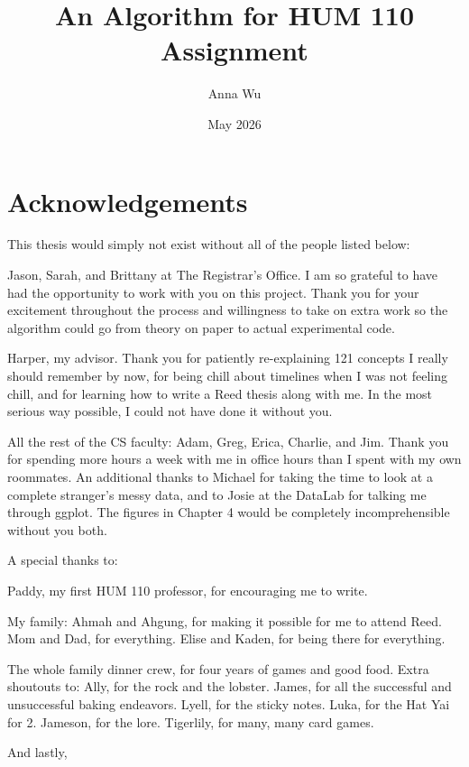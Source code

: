 \documentclass[12pt,twoside]{reedthesis}
\title{An Algorithm for HUM 110 Assignment} \author{Anna Wu} \date{May 2026}
\theoremstyle{definition} \newtheorem{definition}[theorem]{Definition}
\theoremstyle{remark} \newtheorem{remark}[theorem]{Remark}
\begin{document}
\maketitle \frontmatter %
\pagestyle{empty} %

\chapter*{Acknowledgements}
This thesis would simply not exist without all of the people listed
below: 

Jason, Sarah, and Brittany at The Registrar's Office.  I am so grateful to
have had the opportunity to work with you on this project. Thank you for your
excitement throughout the process and willingness to take on extra work so the
algorithm could go from theory on paper to actual experimental code. 

Harper, my advisor. Thank you for patiently re-explaining 121 concepts I really should
remember by now, for being chill about timelines when I was not feeling chill, and
for learning how to write a Reed thesis along with me. In the most serious way
possible, I could not have done it without you. 

All the rest of the CS faculty: Adam, Greg, Erica, Charlie,
and Jim. Thank you for spending more hours a week with me in office hours than I spent
with my own roommates. An additional thanks to Michael for taking the time to
look at a complete stranger's messy data, and to Josie at the DataLab for talking
me through ggplot. The figures in Chapter 4 would be completely incomprehensible
without you both. 

A special thanks to: 

Paddy, my first HUM 110 professor, for encouraging me to write.  

My family: Ahmah and Ahgung, for making it possible for me to attend Reed. Mom and Dad, for everything. Elise and Kaden, for being there for everything.

The whole family dinner crew, for four years of games and good food. Extra
shoutouts to: Ally, for
the rock and the lobster. James, for all the successful and unsuccessful baking
endeavors. Lyell, for the sticky notes. Luka, for the Hat Yai for 2. Jameson,
for the lore. Tigerlily, for many, many card games. 

And lastly, 
\end{document}
